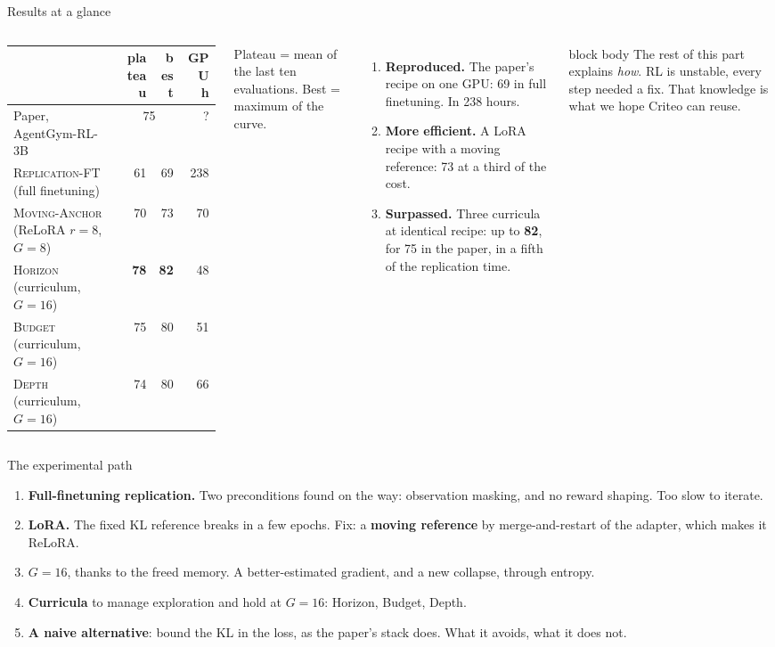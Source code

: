 \documentclass[aspectratio=169,10pt]{beamer}
\newcommand{\hl}[1]{\textcolor{crOrange}{\textbf{#1}}}
\newenvironment{keymsg}{\begin{beamercolorbox}[sep=6pt,wd=\textwidth]{block body}\small}{\end{beamercolorbox}}
\begin{document}
\begin{frame}{Results at a glance}
\begin{columns}[T]
\footnotesize\setlength{\tabcolsep}{4pt}
\begin{tabular}{@{}lrrr@{}}
\toprule
 & plateau & best & GPU h \\
\midrule
Paper, AgentGym-RL-3B & \multicolumn{2}{c}{75} & ? \\
\midrule
\textsc{Replication-FT} (full finetuning) & 61 & 69 & 238 \\
\textsc{Moving-Anchor} (ReLoRA $r{=}8$, $G{=}8$) & 70 & 73 & 70 \\
\textsc{Horizon} (curriculum, $G{=}16$) & \textbf{78} & \textbf{82} & 48 \\
\textsc{Budget} (curriculum, $G{=}16$) & 75 & 80 & 51 \\
\textsc{Depth} (curriculum, $G{=}16$) & 74 & 80 & 66 \\
\bottomrule
\end{tabular}
\vspace{0.15cm}
{\scriptsize Plateau = mean of the last ten evaluations. Best = maximum of the curve.}
\begin{enumerate}
  \item \textbf{Reproduced.} The paper's recipe on one GPU: 69 in full finetuning. In 238 hours.
  \item \textbf{More efficient.} A LoRA recipe with a moving reference: 73 at a third of the cost.
  \item \textbf{Surpassed.} Three curricula at identical recipe: up to \hl{82}, for 75 in the paper, in a fifth of the replication time.
\end{enumerate}
\vspace{0.1cm}
\begin{keymsg}
The rest of this part explains \emph{how}. RL is unstable, every step needed a fix. That knowledge is what we hope Criteo can reuse.
\end{keymsg}
\end{columns}
\end{frame}

\begin{frame}{The experimental path}
\begin{enumerate}\setlength{\itemsep}{0.15cm}
  \item \textbf{Full-finetuning replication.} Two preconditions found on the way: observation masking, and no reward shaping. Too slow to iterate.
  \item \textbf{LoRA.} The fixed KL reference breaks in a few epochs. Fix: a \hl{moving reference} by merge-and-restart of the adapter, which makes it ReLoRA.
  \item \textbf{$G=16$}, thanks to the freed memory. A better-estimated gradient, and a new collapse, through entropy.
  \item \textbf{Curricula} to manage exploration and hold at $G=16$: Horizon, Budget, Depth.
  \item \textbf{A naive alternative}: bound the KL in the loss, as the paper's stack does. What it avoids, what it does not.
\end{enumerate}
\end{frame}
\end{document}

